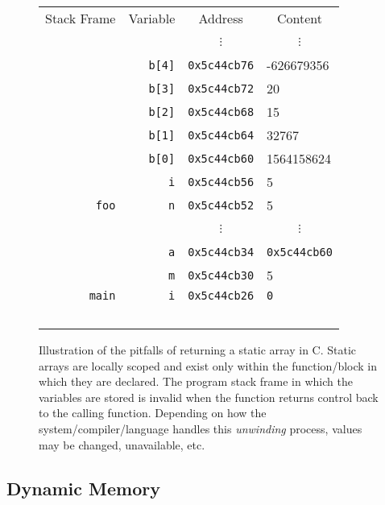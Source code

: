 \begin{figure}[H]
{\begin{tabular}{rr|l|l|}
\multicolumn{1}{c}{Stack Frame}  & \multicolumn{1}{c}{Variable} & \multicolumn{1}{c}{Address} & \multicolumn{1}{c}{Content} \\
\multicolumn{1}{c}{~} & \multicolumn{1}{c}{~} & \multicolumn{1}{c}{$\vdots$} & \multicolumn{1}{c}{$\vdots$}\\
\cline{3-4}
~ & \texttt{b[4]} & \texttt{0x5c44cb76} & -626679356 \\
\cline{3-4}
~ & \texttt{b[3]} & \texttt{0x5c44cb72} & 20 \\
\cline{3-4}
~ & \texttt{b[2]} & \texttt{0x5c44cb68} & 15 \\
\cline{3-4}
~ & \texttt{b[1]} & \texttt{0x5c44cb64} & 32767 \\
\cline{3-4}
~ & \texttt{b[0]} & \texttt{0x5c44cb60} & 1564158624 \\
\cline{3-4}
~ & \texttt{i} & \texttt{0x5c44cb56} & 5 \\
\cline{3-4}
\texttt{foo} & \texttt{n} & \texttt{0x5c44cb52} & 5 \\
\cline{1-4}
~ & \multicolumn{1}{c}{~} & \multicolumn{1}{c}{$\vdots$} & \multicolumn{1}{c}{$\vdots$} \\
\cline{3-4}
~ & \texttt{a} & \texttt{0x5c44cb34} & \texttt{0x5c44cb60} \\
\cline{3-4}
~ & \texttt{m} & \texttt{0x5c44cb30} & 5 \\
\cline{3-4}
\texttt{main} & \texttt{i} & \texttt{0x5c44cb26} & \texttt{0} \\
\cline{1-4}
~\\
\end{tabular}

}
\caption[Pitfalls of Returning Static Arrays]{Illustration of the pitfalls of returning a static 
array in C.  Static arrays are locally scoped and
exist only within the function/block in which they are declared.  The program stack frame in which
the variables are stored is invalid when the function returns control back to the calling function.  
Depending on how the system/compiler/language handles this \emph{unwinding} process, values
may be changed, unavailable, etc.}
\label{fig:returningStaticArrays}
\end{figure}

\subsection{Dynamic Memory}

